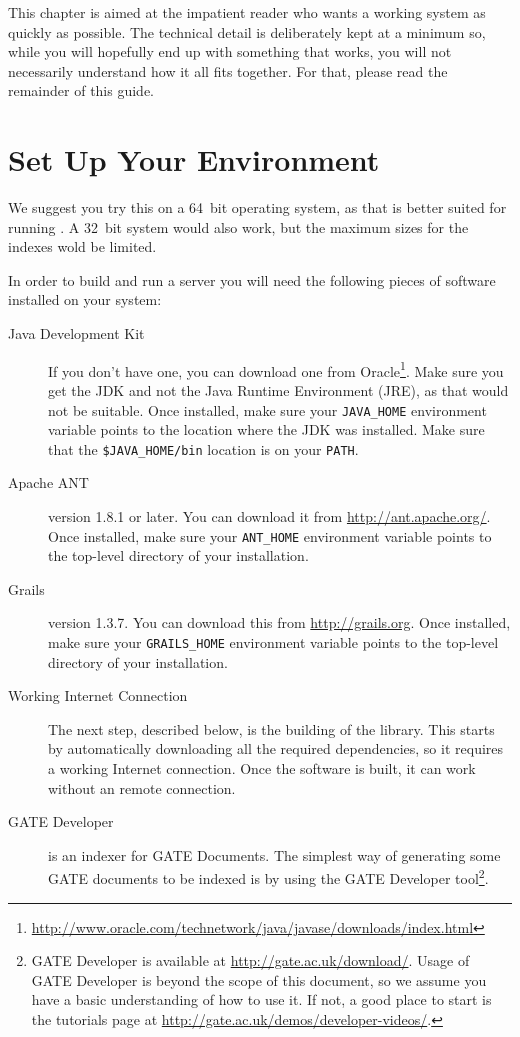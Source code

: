 This chapter is aimed at the impatient reader who wants a working system as
quickly as possible. The technical detail is deliberately kept at a minimum so,
while you will hopefully end up with something that works, you will not
necessarily understand how it all fits together. For that, please read the
remainder of this guide.

\section{Set Up Your Environment}
We suggest you try this on a 64~bit operating system, as that is better suited
for running \Mimir{}. A 32~bit system would also work, but the maximum sizes for
the indexes wold be limited.

In order to build and run a \Mimir{} server you will need the following pieces
of software installed on your system:
\begin{description}
  \item[Java Development Kit] If you don't have one, you can download one from
  Oracle\footnote{\url{http://www.oracle.com/technetwork/java/javase/downloads/index.html}}.
  Make sure you get the JDK and not the Java Runtime Environment (JRE), as that
  would not be suitable. Once installed, make sure your \verb!JAVA_HOME!
  environment variable points to the location where the JDK was installed.  Make
  sure that the \verb!$JAVA_HOME/bin! location is on your \verb!PATH!.
  \item[Apache ANT] version 1.8.1 or later. You can download it from
  \url{http://ant.apache.org/}. Once installed, make sure your \verb!ANT_HOME!
  environment variable points to the top-level directory of your installation.
  \item[Grails] version 1.3.7. You can download this from
  \url{http://grails.org}. Once installed, make sure your \verb!GRAILS_HOME!
  environment variable points to the top-level directory of your installation.
  \item[Working Internet Connection] The next step, described below, is the
  building of the \Mimir{} library. This starts by automatically downloading all
  the required dependencies, so it requires a working Internet connection. Once
  the software is built, it can work without an remote connection.
  \item[GATE Developer] \Mimir{} is an indexer for GATE Documents. The simplest
  way of generating some GATE documents to be indexed is by using the GATE
  Developer tool\footnote{GATE Developer is available at
  \url{http://gate.ac.uk/download/}. Usage of GATE Developer is beyond the scope
  of this document, so we assume you have a basic understanding of how to use
  it. If not, a good place to start is the tutorials page at
  \url{http://gate.ac.uk/demos/developer-videos/}.}. 
\end{description}
%
